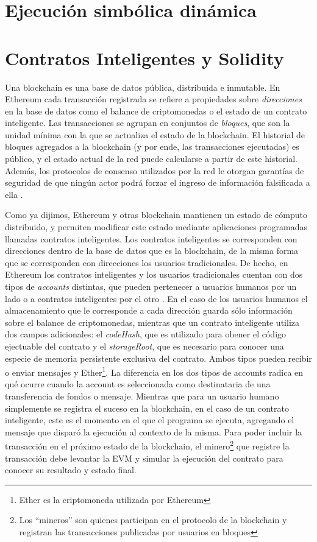\section{Ejecución simbólica dinámica}

\section{Contratos Inteligentes y Solidity}
Una blockchain es una base de datos pública, distribuida e inmutable.
En Ethereum cada transacción registrada se refiere a propiedades sobre \textit{direcciones} en la base de datos como el balance de criptomonedas o el estado de un contrato inteligente.
Las transacciones se agrupan en conjuntos de \textit{bloques}, que son la unidad mínima con la que se actualiza el estado de la blockchain.
El historial de bloques agregados a la blockchain (y por ende, las transacciones ejecutadas) es público, y el estado actual de la red puede calcularse a partir de este historial.
Además, los protocolos de consenso utilizados por la red le otorgan garantías de seguridad de que ningún actor podrá forzar el ingreso de información falsificada a ella \cite{protocolos-consenso}.

Como ya dijimos, Ethereum y otras blockchain mantienen un estado de cómputo distribuido, y permiten modificar este estado mediante aplicaciones programadas llamadas contratos inteligentes.
Los contratos inteligentes se corresponden con direcciones dentro de la base de datos que es la blockchain, de la misma forma que se corresponden con direcciones los usuarios tradicionales.
De hecho, en Ethereum los contratos inteligentes y los usuarios tradicionales cuentan con dos tipos de \textit{accounts} distintas, que pueden pertenecer a usuarios humanos por un lado o a contratos inteligentes por el otro .
En el caso de los usuarios humanos el almacenamiento que le corresponde a cada dirección guarda sólo información sobre el balance de criptomonedas, mientras que un contrato inteligente utiliza dos campos adicionales: el \textit{codeHash}, que es utilizado para obener el código ejectuable del contrato y el \textit{storageRoot}, que es necesario para conocer una especie de memoria persistente exclusiva del contrato.
Ambos tipos pueden recibir o enviar mensajes y Ether\footnote{Ether es la criptomoneda utilizada por Ethereum}.
La diferencia en los dos tipos de accounts radica en qué ocurre cuando la account es seleccionada como destinataria de una transferencia de fondos o mensaje.
Mientras que para un usuario humano simplemente se registra el suceso en la blockchain, en el caso de un contrato inteligente, este es el momento en el que el programa se ejecuta, agregando el mensaje que disparó la ejecución al contexto de la misma.
Para poder incluir la transacción en el próximo estado de la blockchain, el minero\footnote{Los ``mineros'' son quienes participan en el protocolo de la blockchain y registran las transacciones publicadas por usuarios en bloques} que registre la transacción debe levantar la EVM y simular la ejecución del contrato para conocer su  resultado y estado final.

